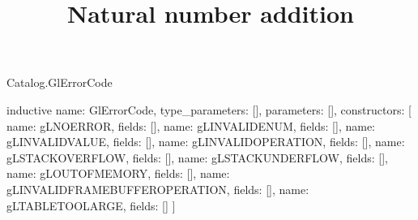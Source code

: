 \begin{lexlean}{Catalog.GlErrorCode}
\title{Natural number addition}
\begin{semanticmodule}
inductive{
  name: GlErrorCode,
  type_parameters: [],
  parameters: [],
  constructors: [
    {name: gLNOERROR, fields: []},
    {name: gLINVALIDENUM, fields: []},
    {name: gLINVALIDVALUE, fields: []},
    {name: gLINVALIDOPERATION, fields: []},
    {name: gLSTACKOVERFLOW, fields: []},
    {name: gLSTACKUNDERFLOW, fields: []},
    {name: gLOUTOFMEMORY, fields: []},
    {name: gLINVALIDFRAMEBUFFEROPERATION, fields: []},
    {name: gLTABLETOOLARGE, fields: []}
  ]
}
\end{semanticmodule}
\end{lexlean}
